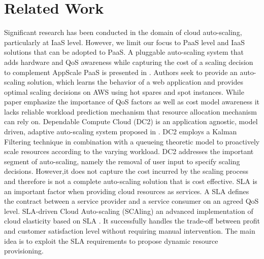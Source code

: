 \section{Related Work}
Significant research has been conducted in the domain of cloud auto-scaling, particularly at IaaS level. However, we limit our focus to PaaS level and IaaS solutions that can be adopted to PaaS. A pluggable auto-scaling system that adds hardware and QoS awareness while capturing the cost of a scaling decision to complement AppScale PaaS is presented in \cite{pluggable}. Authors seek to provide an auto-scaling solution, which learns the behavior of a web application and provides optimal scaling decisions on AWS using hot spares and spot instances.
While paper emphasize the importance of QoS factors as well as cost model awareness it lacks reliable workload prediction mechanism that resource allocation mechanism can rely on. Dependable Compute Cloud (DC2) is an application agnostic, model driven, adaptive auto-scaling system proposed in \cite{modeldriven}. DC2 employs a Kalman Filtering technique in combination with a queueing theoretic model to proactively scale resources according to the varying workload. DC2 addresses the important segment of auto-scaling, namely the removal of user input to specify scaling decisions. However,it does not capture the cost incurred by the scaling process and therefore is not a complete auto-scaling solution that is cost effective. SLA is an important factor when providing cloud resources as services. A SLA defines the contract between a service provider and a service consumer on an agreed QoS level. SLA-driven Cloud Auto-scaling (SCAling) an advanced implementation of cloud elasticity based on SLA \cite{sladriven}. It successfully handles the trade-off between profit and customer satisfaction level without requiring manual intervention. The main idea is to exploit the SLA requirements to propose dynamic resource provisioning.

